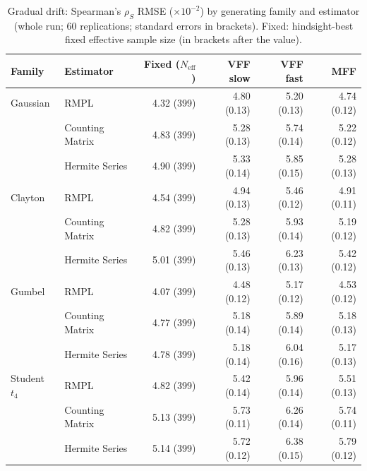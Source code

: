 \begin{table}[htbp]
\centering
\small
\caption{Gradual drift: Spearman's $\rho_S$ RMSE ($\times10^{-2}$) by generating family and estimator (whole run; 60 replications; standard errors in brackets). Fixed: hindsight-best fixed effective sample size (in brackets after the value).}
\label{tab:app-strategy-rmse-drift}
\begin{tabular}{llrrrr}
\toprule
Family & Estimator & Fixed ($N_{\mathrm{eff}}$) & VFF slow & VFF fast & MFF \\
\midrule
Gaussian & RMPL & 4.32 (399) & 4.80 (0.13) & 5.20 (0.13) & 4.74 (0.12) \\
 & Counting Matrix & 4.83 (399) & 5.28 (0.13) & 5.74 (0.14) & 5.22 (0.12) \\
 & Hermite Series & 4.90 (399) & 5.33 (0.14) & 5.85 (0.15) & 5.28 (0.13) \\
\addlinespace
Clayton & RMPL & 4.54 (399) & 4.94 (0.13) & 5.46 (0.12) & 4.91 (0.11) \\
 & Counting Matrix & 4.82 (399) & 5.28 (0.13) & 5.93 (0.14) & 5.19 (0.12) \\
 & Hermite Series & 5.01 (399) & 5.46 (0.13) & 6.23 (0.13) & 5.42 (0.12) \\
\addlinespace
Gumbel & RMPL & 4.07 (399) & 4.48 (0.12) & 5.17 (0.12) & 4.53 (0.12) \\
 & Counting Matrix & 4.77 (399) & 5.18 (0.14) & 5.89 (0.14) & 5.18 (0.13) \\
 & Hermite Series & 4.78 (399) & 5.18 (0.14) & 6.04 (0.16) & 5.17 (0.13) \\
\addlinespace
Student $t_4$ & RMPL & 4.82 (399) & 5.42 (0.14) & 5.96 (0.14) & 5.51 (0.13) \\
 & Counting Matrix & 5.13 (399) & 5.73 (0.11) & 6.26 (0.14) & 5.74 (0.11) \\
 & Hermite Series & 5.14 (399) & 5.72 (0.12) & 6.38 (0.15) & 5.79 (0.12) \\
\bottomrule
\end{tabular}
\end{table}

